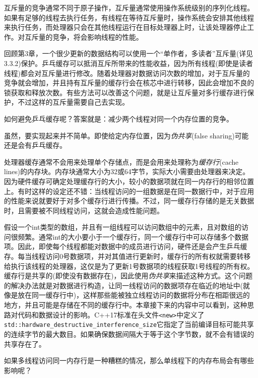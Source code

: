 互斥量的竞争通常不同于原子操作，互斥量通常使用操作系统级别的序列化线程。如果有足够的线程去执行任务，有线程在等待互斥量时，操作系统会安排其他线程来执行任务，而处理器只会在其他线程运行在目标处理器上时，让该处理器停止工作。对互斥量的竞争，将会影响线程的性能。

回顾第3章，一个很少更新的数据结构可以使用一个“单作者，多读者”互斥量(详见3.3.2)保护。乒乓缓存可以抵消互斥所带来的性能收益，因为所有线程(即使是读者线程)都会对互斥量进行修改。随着处理器对数据访问次数的增加，对于互斥量的竞争就会增加，并且持有互斥量的缓存行会在核芯中进行转移，因此会增加不良的锁获取和释放次数。有些方法可以改善这个问题，就是让互斥量对多行缓存进行保护，不过这样的互斥量需要自己去实现。

如何避免乒乓缓存呢？答案就是：减少两个线程对同一个内存位置的竞争。

虽然，要实现起来并不简单。即使给定内存位置，因为\textit{伪共享}(false sharing)可能还是会有乒乓缓存。


处理器缓存通常不会用来处理单个存储点，而是会用来处理称为\textit{缓存行}(cache lines)的内存块。内存块通常大小为32或64字节，实际大小需要由处理器来决定。因为硬件缓存可确定处理缓存行的大小，较小的数据项就在同一内存行的相邻位置上。有时这样的设定还不错：当线程访问的一组数据是在同一数据行中，对于应用的性能来说就要好于对多个缓存行进行传播。不过，同一缓存行存储的是无关数据时，且需要被不同线程访问，这就会造成性能问题。

假设一个int类型的数组，并且有一组线程可以访问数组中的元素，且对数组的访问很频繁。通常int的大小要小于一个缓存行，同一个缓存行中可以存储多个数据项。因此，即使每个线程都能对数据中的成员进行访问，硬件还是会产生乒乓缓存。每当线程访问0号数据项，并对其值进行更新时，缓存行的所有权就需要转移给执行该线程的处理器，这仅是为了更新1号数据项的线程获取1号线程的所有权。缓存行是共享的(即使没有数据存在)，因此使用\textit{伪共享}来描述这种方式。这个问题的解决办法就是对数据进行构造，让同一线程访问的数据项存在临近的地址中(就像是放在同一缓存行中)，这样那些能被独立线程访问的数据将分布在相距很远的地方，并且可能是存储在不同的缓存行中。本章接下来的内容中可以看到，这种思路对代码和数据设计的影响。C++17标准在头文件\texttt{<new>}中定义了\texttt{std::hardware\_destructive\_interference\_size}它指定了当前编译目标可能共享的连续字节的最大数目。如果确保数据间隔大于等于这个字节数，就不会有错误的共享存在了。

如果多线程访问同一内存行是一种糟糕的情况，那么单线程下的内存布局会有哪些影响呢？


